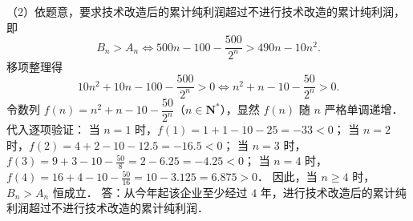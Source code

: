 \begin{answer}
（2）依题意，要求技术改造后的累计纯利润超过不进行技术改造的累计纯利润，即
\nopagebreak[4]
\[
B_n > A_n \iff 500n - 100 - \frac{500}{2^n} > 490n - 10n^2.
\]
移项整理得
\nopagebreak[4]
\[
10n^2 + 10n - 100 - \frac{500}{2^n} > 0 \iff n^2 + n - 10 - \frac{50}{2^n} > 0.
\]
令数列 $f(n) = n^2 + n - 10 - \dfrac{50}{2^n}$（$n \in \mathbf{N}^*$），显然 $f(n)$ 随 $n$ 严格单调递增．
代入逐项验证：
当 $n = 1$ 时，$f(1) = 1 + 1 - 10 - 25 = -33 < 0$；
当 $n = 2$ 时，$f(2) = 4 + 2 - 10 - 12.5 = -16.5 < 0$；
当 $n = 3$ 时，$f(3) = 9 + 3 - 10 - \frac{50}{8} = 2 - 6.25 = -4.25 < 0$；
当 $n = 4$ 时，$f(4) = 16 + 4 - 10 - \frac{50}{16} = 10 - 3.125 = 6.875 > 0$．
因此，当 $n \geqslant 4$ 时，$B_n > A_n$ 恒成立．
答：从今年起该企业至少经过 $4$ 年，进行技术改造后的累计纯利润超过不进行技术改造的累计纯利润．


\end{answer}
